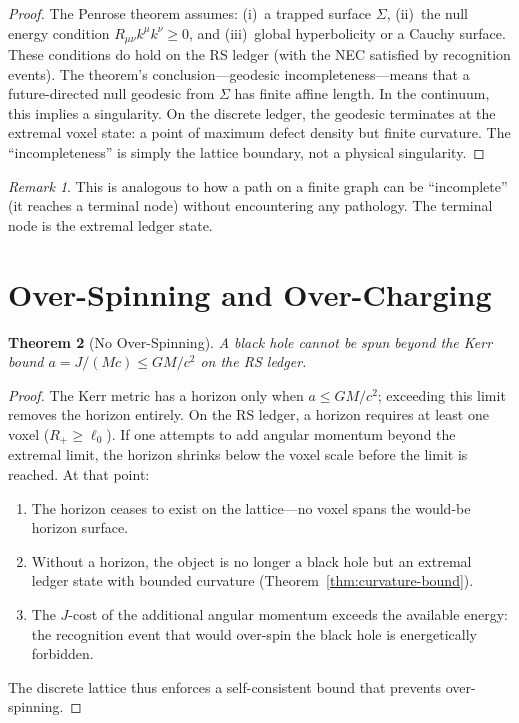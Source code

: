 \documentclass[12pt,a4paper]{article}
\newtheorem{theorem}{Theorem}[section]
\theoremstyle{definition}
\theoremstyle{remark}
\newtheorem{remark}[theorem]{Remark}
\begin{document}
\begin{proof}
The Penrose theorem assumes: (i)~a trapped surface $\Sigma$,
(ii)~the null energy condition $R_{\mu\nu} k^\mu k^\nu \geq 0$, and
(iii)~global hyperbolicity or a Cauchy surface.  These conditions do
hold on the RS ledger (with the NEC satisfied by recognition events).
The theorem's conclusion---geodesic incompleteness---means that a
future-directed null geodesic from $\Sigma$ has finite affine
length.  In the continuum, this implies a singularity.  On the
discrete ledger, the geodesic terminates at the extremal voxel state:
a point of maximum defect density but finite curvature.  The
``incompleteness'' is simply the lattice boundary, not a physical
singularity.
\end{proof}

\begin{remark}
This is analogous to how a path on a finite graph can be
``incomplete'' (it reaches a terminal node) without encountering any
pathology.  The terminal node is the extremal ledger state.
\end{remark}

\section{Over-Spinning and Over-Charging}
\label{sec:extremal}

\begin{theorem}[No Over-Spinning]
\label{thm:no-overspin}
A black hole cannot be spun beyond the Kerr bound $a = J/(Mc) \leq
GM/c^2$ on the RS ledger.
\end{theorem}

\begin{proof}
The Kerr metric has a horizon only when $a \leq GM/c^2$; exceeding
this limit removes the horizon entirely.  On the RS ledger, a
horizon requires at least one voxel ($R_+ \geq \ell_0$).  If one
attempts to add angular momentum beyond the extremal limit, the
horizon shrinks below the voxel scale before the limit is reached.
At that point:
\begin{enumerate}[label=(\roman*),nosep]
  \item The horizon ceases to exist on the lattice---no voxel spans
  the would-be horizon surface.
  \item Without a horizon, the object is no longer a black hole but
  an extremal ledger state with bounded curvature
  (Theorem~\ref{thm:curvature-bound}).
  \item The $J$-cost of the additional angular momentum exceeds the
  available energy: the recognition event that would over-spin the
  black hole is energetically forbidden.
\end{enumerate}
The discrete lattice thus enforces a self-consistent bound that
prevents over-spinning.
\end{proof}
\end{document}
